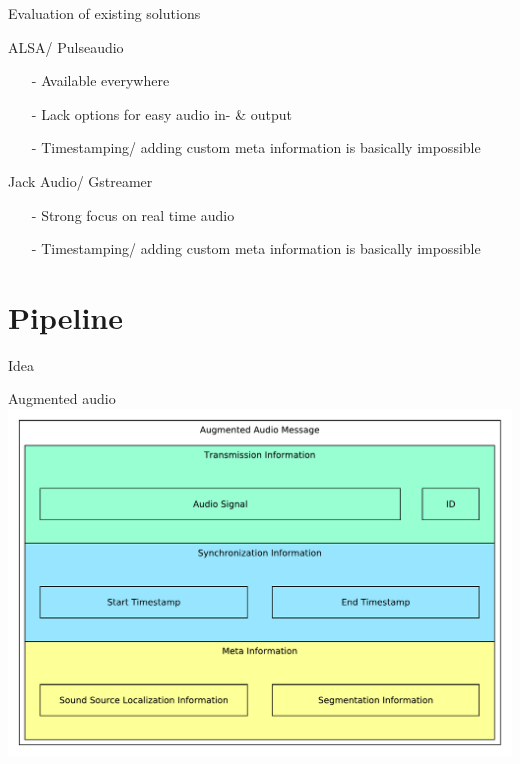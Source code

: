 \documentclass{beamer}
\begin{document}
	
	\begin{frame}{Evaluation of existing solutions}
		\begin{alertblock}{ALSA/ Pulseaudio}
			\begin{itemize}
				\item[-] Available everywhere
				\item[-] Lack options for easy audio in- \& output
				\item[-] Timestamping/ adding custom meta information is basically impossible
			\end{itemize}
		\end{alertblock}
		\pause
		\begin{alertblock}{Jack Audio/ Gstreamer}
			\begin{itemize}
				\item[-] Strong focus on real time audio
				\item[-] Timestamping/ adding custom meta information is basically impossible
			\end{itemize}
		\end{alertblock}
	\end{frame}
	
	
	
	
	
	

	\section{Pipeline}
	
	\begin{frame}{Idea}
		
	\end{frame}
	
	\begin{frame}{Augmented audio}
		\centering
		\includegraphics[width=\textwidth]{Bilder/augmented_audio}
	\end{frame}
	
\end{document}
